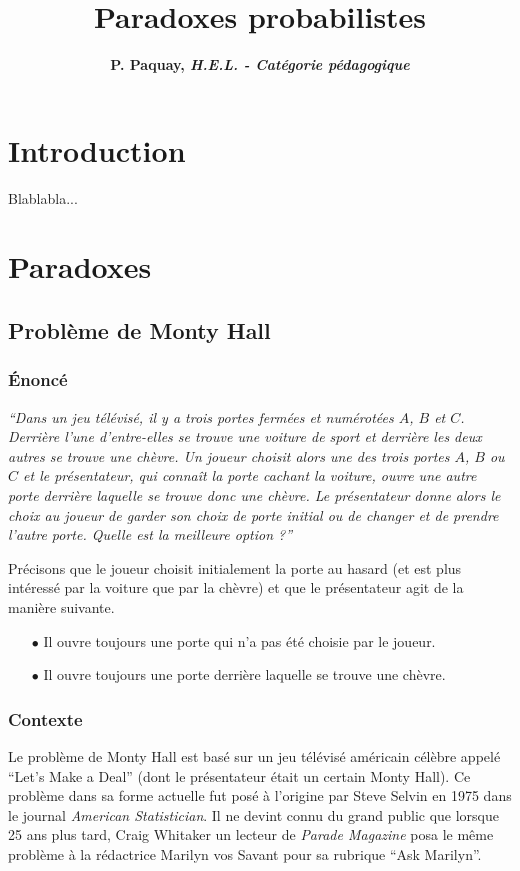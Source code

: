 \documentclass[11pt,a4paper]{article}
\title{\textbf{Paradoxes probabilistes}}
\author{\textbf{P. Paquay, \textsl{H.E.L. - Catégorie pédagogique}}}
\date{}
\begin{document}
\maketitle

\section{Introduction}

Blablabla...

\section{Paradoxes}

\subsection{Problème de Monty Hall}

\subsubsection{Énoncé}

\textit{``Dans un jeu télévisé, il y a trois portes fermées et numérotées $A$, $B$ et $C$. Derrière l'une d'entre-elles se trouve une voiture de sport et derrière les deux autres se trouve une chèvre. Un joueur choisit alors une des trois portes $A$, $B$ ou $C$ et le présentateur, qui connaît la porte cachant la voiture, ouvre une autre porte derrière laquelle se trouve donc une chèvre. Le présentateur donne alors le choix au joueur de garder son choix de porte initial ou de changer et de prendre l'autre porte. Quelle est la meilleure option ?''}

Précisons que le joueur choisit initialement la porte au hasard (et est plus intéressé par la voiture que par la chèvre) et que le présentateur agit de la manière suivante.
\begin{itemize}
\item[$\bullet$]
Il ouvre toujours une porte qui n'a pas été choisie par le joueur.
\item[$\bullet$]
Il ouvre toujours une porte derrière laquelle se trouve une chèvre.
\end{itemize}

\subsubsection{Contexte}

Le problème de Monty Hall est basé sur un jeu télévisé américain célèbre appelé ``Let's Make a Deal'' (dont le présentateur était un certain Monty Hall). Ce problème dans sa forme actuelle fut posé à l'origine par Steve Selvin en 1975 dans le journal \textsl{American Statistician}. Il ne devint connu du grand public que lorsque 25 ans plus tard, Craig Whitaker un lecteur de \textsl{Parade Magazine} posa le même problème à la rédactrice Marilyn vos Savant pour sa rubrique ``Ask Marilyn''.
\end{document}
